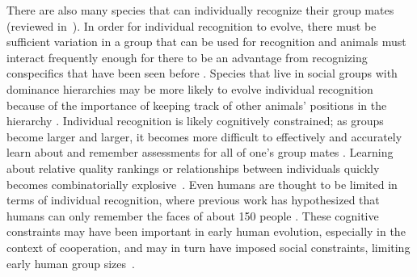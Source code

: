 There are also many species that can individually recognize their group mates (reviewed in~\cite{Tibbetts2007IndividualDifferent,Wiley2013SpecificityBehaviour}). In order for individual recognition to evolve, there must be sufficient variation in a group that can be used for recognition and animals must interact frequently enough for there to be an advantage from recognizing conspecifics that have been seen before \cite{Sheehan:2014fk,Whitfield:1987tg}. Species that live in social groups with dominance hierarchies may be more likely to evolve individual recognition because of the importance of keeping track of other animals' positions in the hierarchy \cite{Barnard:1979fk,Whitfield:1987tg}. Individual recognition is likely cognitively constrained; as groups become larger and larger, it becomes more difficult to effectively and accurately learn about and remember assessments for all of one's group mates \cite{Rohwer:1982fk,Solberg:1997uq}. Learning about relative quality rankings or relationships between individuals quickly becomes combinatorially explosive~\cite{Seyfarth2015SocialCognition}. Even humans are thought to be limited in terms of individual recognition, where previous work has hypothesized that humans can only remember the faces of about 150 people \cite{Dunbar:1993zr,Hill:2003ly}. These cognitive constraints may have been important in early human evolution, especially in the context of cooperation, and may in turn have imposed social constraints, limiting early human group sizes~\cite{Dunbar:1993zr,Dunbar:1992ys}.


